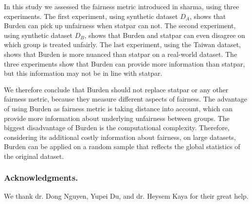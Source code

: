 \documentclass[runningheads]{llncs}
\begin{document}
In this study we assessed the fairness metric introduced in \gls{sharma}, using
three experiments. The first experiment, using synthetic dataset $D_A$, shows
that \gls{Burden} can pick up unfairness when \gls{statpar} can not. The second
experiment, using synthetic dataset $D_B$, shows that \gls{Burden} and
\gls{statpar} can even disagree on which group is treated unfairly. The last
experiment, using the Taiwan dataset, shows that \gls{Burden} is more nuanced
than \gls{statpar} on a real-world dataset. The three experiments show that
\gls{Burden} can provide more information than \gls{statpar}, but this
information may not be in line with \gls{statpar}.

We therefore conclude that \gls{Burden} should not replace \gls{statpar} or any
other fairness metric, because they measure  different aspects of fairness. The
advantage of using \gls{Burden} as fairness metric is taking distance into
account, which can provide more information about underlying unfairness between
groups. The biggest disadvantage of \gls{Burden} is the computational
complexity. Therefore, considering its additional costly information about
fairness, on large datasets, Burden can be applied on a random sample that
reflects the global statistics of the original dataset.

\subsubsection*{Acknowledgments.}

We thank dr. Dong Nguyen, Yupei Du, and dr. Heysem Kaya for their great help.



\end{document}
